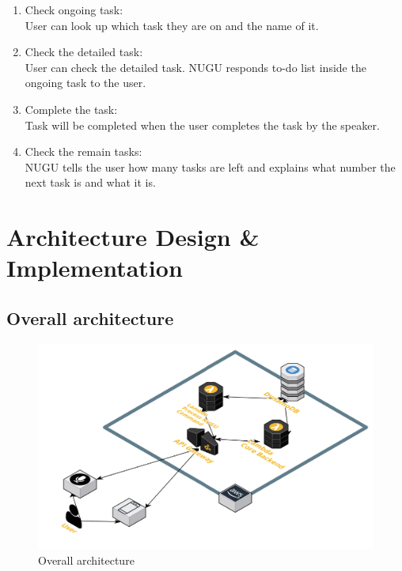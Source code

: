 \documentclass[conference]{IEEEtran}
\begin{document}
\begin{enumerate}
    \item Check ongoing task: \\
    User can look up which task they are on and the name of it. 
    
    \item Check the detailed task: \\
    User can check the detailed task. NUGU responds to-do list inside the ongoing task to the user.
    
    \item Complete the task: \\
    Task will be completed when the user completes the task by the speaker.
    
    \item Check the remain tasks: \\
    NUGU tells the user how many tasks are left and explains what number the next task is and what it is. \\
    
\end{enumerate}

\section{Architecture Design & Implementation}
\subsection{Overall architecture} 

\begin{figure}[htp] \centering \includegraphics[width=450pt]{cloud-architecture.jpg} \caption{Overall architecture} \label{fig:Overall architecture} \end{figure} \twocolumn
\end{document}
